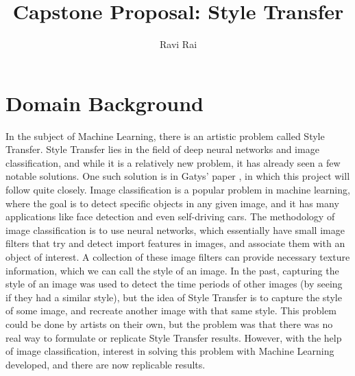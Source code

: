 \documentclass[9pt]{article}
\begin{document}
 



\begin{titlepage}
\title{\textbf{Capstone Proposal: Style Transfer}}
\author{Ravi Rai}
\maketitle

\end{titlepage}

\newpage
\section{Domain Background}
In the subject of Machine Learning, there is an artistic problem called Style Transfer. Style Transfer lies in the field of deep neural networks and image classification, and while it is a relatively new problem, it has already seen a few notable solutions. One such solution is in Gatys' paper \cite{Neural}, in which this project will follow quite closely. Image classification is a popular problem in machine learning, where the goal is to detect specific objects in any given image, and it has many applications like face detection and even self-driving cars. The methodology of image classification is to use neural networks, which essentially have small image filters that try and detect import features in images, and associate them with an object of interest. A collection of these image filters can provide necessary texture information, which we can call the style of an image. In the past, capturing the style of an image was used to detect the time periods of other images (by seeing if they had a similar style), but the idea of Style Transfer is to capture the style of some image, and recreate another image with that same style. This problem could be done by artists on their own, but the problem was that there was no real way to formulate or replicate Style Transfer results. However, with the help of image classification, interest in solving this problem with Machine Learning developed, and there are now replicable results.
\end{document}
